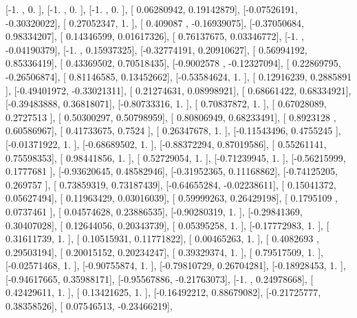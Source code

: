 \documentclass{article}
\begin{document}
       [-1.        ,  0.        ],
       [-1.        ,  0.        ],
       [-1.        ,  0.        ],
       [ 0.06280942,  0.19142879],
       [-0.07526191, -0.30320022],
       [ 0.27052347,  1.        ],
       [ 0.409087  , -0.16939075],
       [-0.37050684,  0.98334207],
       [ 0.14346599,  0.01617326],
       [ 0.76137675,  0.03346772],
       [-1.        , -0.04190379],
       [-1.        ,  0.15937325],
       [-0.32774191,  0.20910627],
       [ 0.56994192,  0.85336419],
       [ 0.43369502,  0.70518435],
       [-0.9002578 , -0.12327094],
       [ 0.22869795, -0.26506874],
       [ 0.81146585,  0.13452662],
       [-0.53584624,  1.        ],
       [ 0.12916239,  0.2885891 ],
       [-0.49401972, -0.33021311],
       [ 0.21274631,  0.08998921],
       [ 0.68661422,  0.68334921],
       [-0.39483888,  0.36818071],
       [-0.80733316,  1.        ],
       [ 0.70837872,  1.        ],
       [ 0.67028089,  0.2727513 ],
       [ 0.50300297,  0.50798959],
       [ 0.80806949,  0.68233491],
       [ 0.8923128 ,  0.60586967],
       [ 0.41733675,  0.7524    ],
       [ 0.26347678,  1.        ],
       [-0.11543496,  0.4755245 ],
       [-0.01371922,  1.        ],
       [-0.68689502,  1.        ],
       [-0.88372294,  0.87019586],
       [ 0.55261141,  0.75598353],
       [ 0.98441856,  1.        ],
       [ 0.52729054,  1.        ],
       [-0.71239945,  1.        ],
       [-0.56215999,  0.1777681 ],
       [-0.93620645,  0.48582946],
       [-0.31952365,  0.11168862],
       [-0.74125205,  0.269757  ],
       [ 0.73859319,  0.73187439],
       [-0.64655284, -0.02238611],
       [ 0.15041372,  0.05627494],
       [ 0.11963429,  0.03016039],
       [ 0.59999263,  0.26429198],
       [ 0.1795109 ,  0.0737461 ],
       [ 0.04574628,  0.23886535],
       [-0.90280319,  1.        ],
       [-0.29841369,  0.30407028],
       [ 0.12644056,  0.20343739],
       [ 0.05395258,  1.        ],
       [-0.17772983,  1.        ],
       [ 0.31611739,  1.        ],
       [ 0.10515931,  0.11771822],
       [ 0.00465263,  1.        ],
       [ 0.4082693 ,  0.29503194],
       [ 0.20015152,  0.20234247],
       [ 0.39329374,  1.        ],
       [ 0.79517509,  1.        ],
       [-0.02571468,  1.        ],
       [-0.90755874,  1.        ],
       [-0.79810729,  0.26704281],
       [-0.18928453,  1.        ],
       [-0.94617665,  0.35988171],
       [-0.95567886, -0.21763073],
       [-1.        ,  0.24978668],
       [ 0.42429611,  1.        ],
       [ 0.13421625,  1.        ],
       [-0.16492212,  0.88679082],
       [-0.21725777,  0.38358526],
       [ 0.07546513, -0.23466219],
\end{document}
